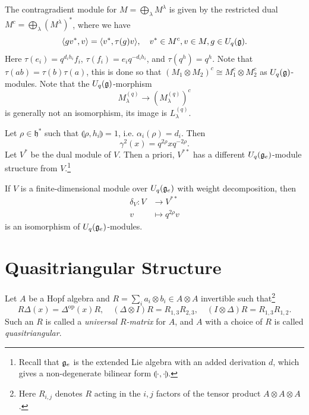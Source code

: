 \begin{remark}
  The contragradient module for
  $M = \bigoplus_\lambda M^\lambda$
  is given by
  the restricted dual
  $M^c = \bigoplus_\lambda (M^\lambda)^*$, where
  we have
  \[
    \langle g v^*, v \rangle
    = \langle v^*, \tau(g) v \rangle,
    \quad v^* \in M^c, v \in M, g \in U_q(\mathfrak{g}).
  \]
  Here $\tau(e_i) = q^{d_i h_i} f_i$,
  $\tau(f_i) = e_i q^{-d_i h_i}$, and
  $\tau(q^h) = q^h$. Note that
  $\tau(ab) = \tau(b) \tau(a)$, this is done so
  that $(M_1 \otimes M_2)^c \cong M_1^c \otimes M_2^c$
  as $U_q(\mathfrak{g})$-modules.
  Note that the $U_q(\mathfrak{g})$-morphism
  \[
    M_\lambda^{(q)}
    \longrightarrow (M_\lambda^{(q)})^c
  \]
  is generally not an isomorphism, its
  image is $L_\lambda^{(q)}$.
\end{remark}

\begin{remark}
  Let $\rho \in \mathfrak{h}^*$ such that
  $\llparenthesis \rho, h_i \rrparenthesis = 1$,
  i.e. $\alpha_i(\rho) = d_i$. Then
  \[
    \gamma^2(x) = q^{2 \rho} x q^{-2 \rho}.
  \]
  Let $V^*$ be the dual module of $V$.
  Then a priori, $V^{**}$ has a different
  $U_q(\mathfrak{g}_e)$-module structure from $V$.\footnote{Recall that $\mathfrak{g}_e$ is the extended Lie algebra with an added derivation $d$, which gives a non-degenerate bilinear form $\llparenthesis \cdot, \cdot \rrparenthesis$.}
\end{remark}

\begin{prop}
  If $V$ is a finite-dimensional module over
  $U_q(\mathfrak{g}_e)$ with weight decomposition, then
  \begin{align*}
    \delta_V : V &\longrightarrow V^{**} \\
    v &\longmapsto q^{2 \rho} v
  \end{align*}
  is an isomorphism of
  $U_q(\mathfrak{g}_e)$-modules.
\end{prop}

\section{Quasitriangular Structure}

\begin{definition}
  Let $A$ be a Hopf algebra and
  $R = \sum_i a_i \otimes b_i \in A \otimes A$
  invertible
  such that\footnote{Here $R_{i, j}$ denotes $R$ acting in the $i, j$ factors of the tensor product $A \otimes A \otimes A$.}
  \[
    R \Delta(x) = \Delta^{\mathrm{op}}(x) R, \quad
    (\Delta \otimes I) R = R_{1, 3} R_{2, 3},
    \quad (I \otimes \Delta) R = R_{1, 3} R_{1, 2}.
  \]
  Such an $R$ is called
  a \emph{universal $R$-matrix} for $A$,
  and $A$ with a choice of
  $R$ is called \emph{quasitriangular}.
\end{definition}

